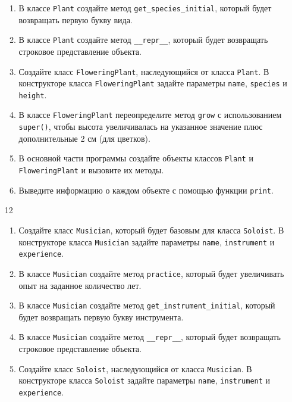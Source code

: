 \begin{enumerate}
\begin{enumerate}
    \item В классе \texttt{Plant} создайте метод \texttt{get\_species\_initial}, который будет возвращать первую букву вида.
    
    \item В классе \texttt{Plant} создайте метод \texttt{\_\_repr\_\_}, который будет возвращать строковое представление объекта.
    
    \item Создайте класс \texttt{FloweringPlant}, наследующийся от класса \texttt{Plant}. В конструкторе класса \texttt{FloweringPlant} задайте параметры \texttt{name}, \texttt{species} и \texttt{height}.
    
    \item В классе \texttt{FloweringPlant} переопределите метод \texttt{grow} с использованием \texttt{super()}, чтобы высота увеличивалась на указанное значение плюс дополнительные 2 см (для цветков).
    
    \item В основной части программы создайте объекты классов \texttt{Plant} и \texttt{FloweringPlant} и вызовите их методы.
    
    \item Выведите информацию о каждом объекте с помощью функции \texttt{print}.
\end{enumerate}

\item[12] 
\begin{enumerate}
    \item Создайте класс \texttt{Musician}, который будет базовым для класса \texttt{Soloist}. В конструкторе класса \texttt{Musician} задайте параметры \texttt{name}, \texttt{instrument} и \texttt{experience}.
    
    \item В классе \texttt{Musician} создайте метод \texttt{practice}, который будет увеличивать опыт на заданное количество лет.
    
    \item В классе \texttt{Musician} создайте метод \texttt{get\_instrument\_initial}, который будет возвращать первую букву инструмента.
    
    \item В классе \texttt{Musician} создайте метод \texttt{\_\_repr\_\_}, который будет возвращать строковое представление объекта.
    
    \item Создайте класс \texttt{Soloist}, наследующийся от класса \texttt{Musician}. В конструкторе класса \texttt{Soloist} задайте параметры \texttt{name}, \texttt{instrument} и \texttt{experience}.
    

\end{enumerate}
\end{enumerate}
